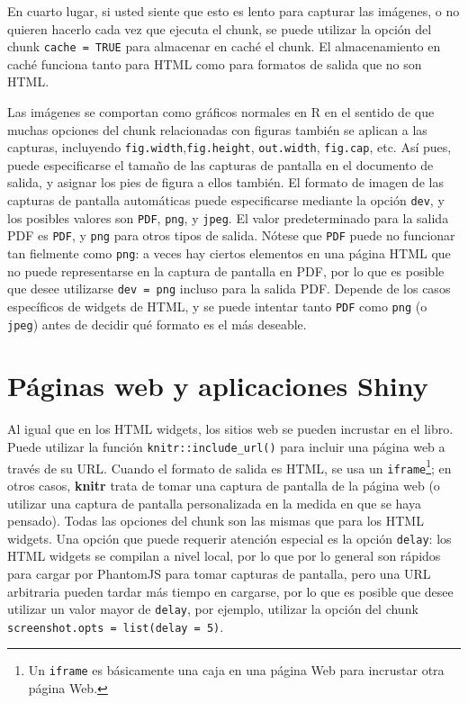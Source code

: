 \documentclass[12pt,]{krantz}
\theoremstyle{definition}
\theoremstyle{definition}
\theoremstyle{definition}
\theoremstyle{remark}
\begin{document}
En cuarto lugar, si usted siente que esto es lento para capturar las
imágenes, o no quieren hacerlo cada vez que ejecuta el chunk, se puede
utilizar la opción del chunk \texttt{cache\ =\ TRUE} para almacenar en
caché el chunk. El almacenamiento en caché funciona tanto para HTML como
para formatos de salida que no son HTML.

Las imágenes se comportan como gráficos normales en R en el sentido de
que muchas opciones del chunk relacionadas con figuras también se
aplican a las capturas, incluyendo
\texttt{fig.width},\texttt{fig.height}, \texttt{out.width},
\texttt{fig.cap}, etc. Así pues, puede especificarse el tamaño de las
capturas de pantalla en el documento de salida, y asignar los pies de
figura a ellos también. El formato de imagen de las capturas de pantalla
automáticas puede especificarse mediante la opción \texttt{dev}, y los
posibles valores son \texttt{PDF}, \texttt{png}, y \texttt{jpeg}. El
valor predeterminado para la salida PDF es \texttt{PDF}, y \texttt{png}
para otros tipos de salida. Nótese que \texttt{PDF} puede no funcionar
tan fielmente como \texttt{png}: a veces hay ciertos elementos en una
página HTML que no puede representarse en la captura de pantalla en PDF,
por lo que es posible que desee utilizarse
\texttt{dev\ =\ \textquotesingle{}png\textquotesingle{}} incluso para la
salida PDF. Depende de los casos específicos de widgets de HTML, y se
puede intentar tanto \texttt{PDF} como \texttt{png} (o \texttt{jpeg})
antes de decidir qué formato es el más deseable.

\section{Páginas web y aplicaciones
Shiny}\label{paginas-web-y-aplicaciones-shiny}

Al igual que en los HTML widgets, los sitios web se pueden incrustar en
el libro. Puede utilizar la función \texttt{knitr::include\_url()} para
incluir una página web a través de su URL. Cuando el formato de salida
es HTML, se usa un \texttt{iframe}\footnote{Un \texttt{iframe} es
  básicamente una caja en una página Web para incrustar otra página Web.};
en otros casos, \textbf{knitr} trata de tomar una captura de pantalla de
la página web (o utilizar una captura de pantalla personalizada en la
medida en que se haya pensado). Todas las opciones del chunk son las
mismas que para los HTML widgets. Una opción que puede requerir atención
especial es la opción \texttt{delay}: los HTML widgets se compilan a
nivel local, por lo que por lo general son rápidos para cargar por
PhantomJS para tomar capturas de pantalla, pero una URL arbitraria
pueden tardar más tiempo en cargarse, por lo que es posible que desee
utilizar un valor mayor de \texttt{delay}, por ejemplo, utilizar la
opción del chunk \texttt{screenshot.opts\ =\ list(delay\ =\ 5)}.
\end{document}

